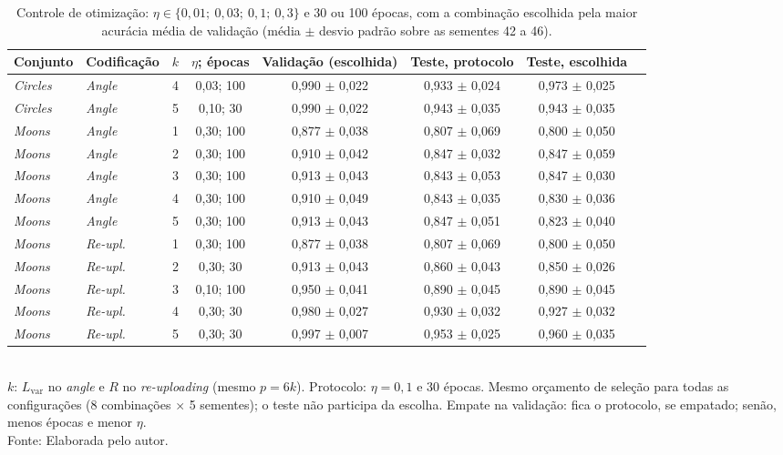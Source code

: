 \begin{table}[htb]
\centering
\footnotesize
\setlength{\tabcolsep}{4pt}
\caption[Controle de otimização]{Controle de otimização: $\eta \in \{0{,}01;\ 0{,}03;\ 0{,}1;\ 0{,}3\}$ e 30 ou 100 épocas, com a combinação escolhida pela maior acurácia média de validação (média $\pm$ desvio padrão sobre as sementes 42 a 46).}
\label{tab:controle-otimizacao}
\begin{tabular}{llcccccc}
\toprule
Conjunto & Codificação & $k$ & $\eta$; épocas & Validação (escolhida) & Teste, protocolo & Teste, escolhida \\
\midrule
\textit{Circles} & \textit{Angle} & 4 & 0,03; 100 & 0,990 $\pm$ 0,022 & 0,933 $\pm$ 0,024 & 0,973 $\pm$ 0,025 \\
\textit{Circles} & \textit{Angle} & 5 & 0,10; 30 & 0,990 $\pm$ 0,022 & 0,943 $\pm$ 0,035 & 0,943 $\pm$ 0,035 \\
\midrule
\textit{Moons} & \textit{Angle} & 1 & 0,30; 100 & 0,877 $\pm$ 0,038 & 0,807 $\pm$ 0,069 & 0,800 $\pm$ 0,050 \\
\textit{Moons} & \textit{Angle} & 2 & 0,30; 100 & 0,910 $\pm$ 0,042 & 0,847 $\pm$ 0,032 & 0,847 $\pm$ 0,059 \\
\textit{Moons} & \textit{Angle} & 3 & 0,30; 100 & 0,913 $\pm$ 0,043 & 0,843 $\pm$ 0,053 & 0,847 $\pm$ 0,030 \\
\textit{Moons} & \textit{Angle} & 4 & 0,30; 100 & 0,910 $\pm$ 0,049 & 0,843 $\pm$ 0,035 & 0,830 $\pm$ 0,036 \\
\textit{Moons} & \textit{Angle} & 5 & 0,30; 100 & 0,913 $\pm$ 0,043 & 0,847 $\pm$ 0,051 & 0,823 $\pm$ 0,040 \\
\textit{Moons} & \textit{Re-upl.} & 1 & 0,30; 100 & 0,877 $\pm$ 0,038 & 0,807 $\pm$ 0,069 & 0,800 $\pm$ 0,050 \\
\textit{Moons} & \textit{Re-upl.} & 2 & 0,30; 30 & 0,913 $\pm$ 0,043 & 0,860 $\pm$ 0,043 & 0,850 $\pm$ 0,026 \\
\textit{Moons} & \textit{Re-upl.} & 3 & 0,10; 100 & 0,950 $\pm$ 0,041 & 0,890 $\pm$ 0,045 & 0,890 $\pm$ 0,045 \\
\textit{Moons} & \textit{Re-upl.} & 4 & 0,30; 30 & 0,980 $\pm$ 0,027 & 0,930 $\pm$ 0,032 & 0,927 $\pm$ 0,032 \\
\textit{Moons} & \textit{Re-upl.} & 5 & 0,30; 30 & 0,997 $\pm$ 0,007 & 0,953 $\pm$ 0,025 & 0,960 $\pm$ 0,035 \\
\bottomrule
\end{tabular}
\\[2pt]
{\footnotesize $k$: $L_\text{var}$ no \textit{angle} e $R$ no \textit{re-uploading} (mesmo $p = 6k$). Protocolo: $\eta = 0{,}1$ e 30 épocas. Mesmo orçamento de seleção para todas as configurações (8 combinações $\times$ 5 sementes); o teste não participa da escolha. Empate na validação: fica o protocolo, se empatado; senão, menos épocas e menor $\eta$.}
\\[2pt]
{\footnotesize Fonte: Elaborada pelo autor.}
\end{table}
